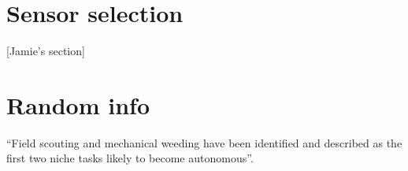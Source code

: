 \documentclass[preprint,authoryear,12pt]{elsarticle}
\begin{document}
\section{Sensor selection}
[Jamie's section]

\section{Random info}

``Field scouting and mechanical weeding have been identified and described as the first two niche tasks likely to become autonomous''\citep{Blackmore2004}.






\end{document}
